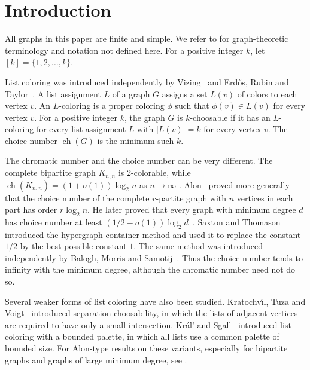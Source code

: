 \documentclass[12pt]{article}
\numberwithin{equation}{section}
\theoremstyle{definition}
\begin{document}



\section{Introduction}

All graphs in this paper are finite and simple. We refer to \cite{BondyMurty2008} for graph-theoretic terminology and notation not defined here. For a positive integer $k$, let $[k]=\{1,2,\ldots,k\}$.

List coloring was introduced independently by Vizing~\cite{Vizing1976} and
Erd\H{o}s, Rubin and Taylor~\cite{ERT1979}. A list assignment $L$ of a graph
$G$ assigns a set $L(v)$ of colors to each vertex $v$. An $L$-coloring is a
proper coloring $\phi$ such that $\phi(v) \in L(v)$ for every vertex $v$. For a
positive integer $k$, the graph $G$ is $k$-choosable if it has an $L$-coloring
for every list assignment $L$ with $|L(v)| = k$ for every vertex $v$. The choice
number $\operatorname{ch}(G)$ is the minimum such $k$.

The chromatic number and the choice number can be very different. The complete
bipartite graph $K_{n,n}$ is 2-colorable, while
$\operatorname{ch}(K_{n,n}) = (1 + o(1))\log_2 n$ as $n \to \infty$
\cite{ERT1979}. Alon~\cite{Alon1992} proved more generally that the choice
number of the complete $r$-partite graph with $n$ vertices in each part has
order $r\log_2 n$. He later proved that every graph with minimum degree $d$ has choice
number at least $(1/2 - o(1))\log_2 d$~\cite{Alon2000}. Saxton and
Thomason~\cite{ST2015} introduced the hypergraph container method and used it
to replace the constant $1/2$ by the best possible constant $1$. The same
method was introduced independently by Balogh, Morris and
Samotij~\cite{BMS2015}. Thus the choice number tends to infinity with the
minimum degree, although the chromatic number need not do so.

Several weaker forms of list coloring have also been studied.
Kratochv{\'\i}l, Tuza and Voigt~\cite{KTV1998Complexity} introduced separation
choosability, in which the lists of adjacent vertices are required to have
only a small intersection. Kr\'al' and Sgall~\cite{KralSgall2005} introduced
list coloring with a bounded palette, in which all lists use a common palette
of bounded size. For Alon-type results on these variants, especially for
bipartite graphs and graphs of large minimum degree, see
\cite{KTV1998Brooks,FKK2014,EKT2019,Kang2013,BonamyKang2017}.
\end{document}

